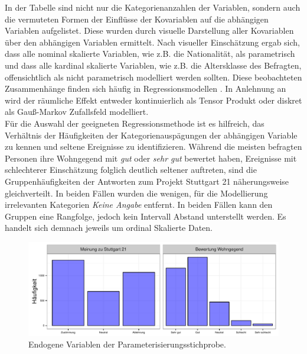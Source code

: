 \documentclass{Vorlage}
\begin{document}
In der Tabelle sind nicht nur die Kategorienanzahlen der Variablen, sondern auch die vermuteten Formen der Einflüsse der Kovariablen auf die abhängigen Variablen aufgelistet. Diese wurden durch visuelle Darstellung aller Kovariablen über den abhängigen Variablen ermittelt. Nach visueller Einschätzung ergab sich, dass alle nominal skalierte Variablen, wie z.B. die Nationalität, als parametrisch und dass alle kardinal skalierte Variablen, wie z.B. die Altersklasse des Befragten, offensichtlich als nicht parametrisch modelliert werden sollten. Diese beobachteten Zusammenhänge finden sich häufig in Regressionsmodellen \cite[p. 9]{fahrmeir2009regression}. In Anlehnung an \cite[p. 503 ff., p. 524 ff.]{fahrmeir2013regression} wird der räumliche Effekt entweder kontinuierlich als Tensor Produkt oder diskret als Gauß-Markov Zufallsfeld modelliert.\\
Für die Auswahl der geeigneten Regressionsmethode ist es hilfreich, das Verhältnis der Häufigkeiten der Kategorienauspägungen der abhängigen Variable zu kennen und seltene Ereignisse zu identifizieren. Während die meisten befragten Personen ihre Wohngegend mit \textit{gut} oder \textit{sehr gut} bewertet haben, Ereignisse mit schlechterer Einschätzung folglich deutlich seltener auftreten, sind die Gruppenhäufigkeiten der Antworten zum Projekt Stuttgart 21 näherungsweise gleichverteilt. In beiden Fällen wurden die wenigen, für die Modellierung irrelevanten Kategorien \textit{Keine Angabe} entfernt. In beiden Fällen kann den Gruppen eine Rangfolge, jedoch kein Intervall Abstand unterstellt werden. Es handelt sich demnach jeweils um ordinal Skalierte Daten.

\begin{figure}[h]
 \begin{center}
 \includegraphics[scale=0.8]{Pictures/BarResp}
 \caption{Endogene Variablen der Parameterisierungsstichprobe.}
 \label{endogene}
 \end{center}
\end{figure}
\end{document}
